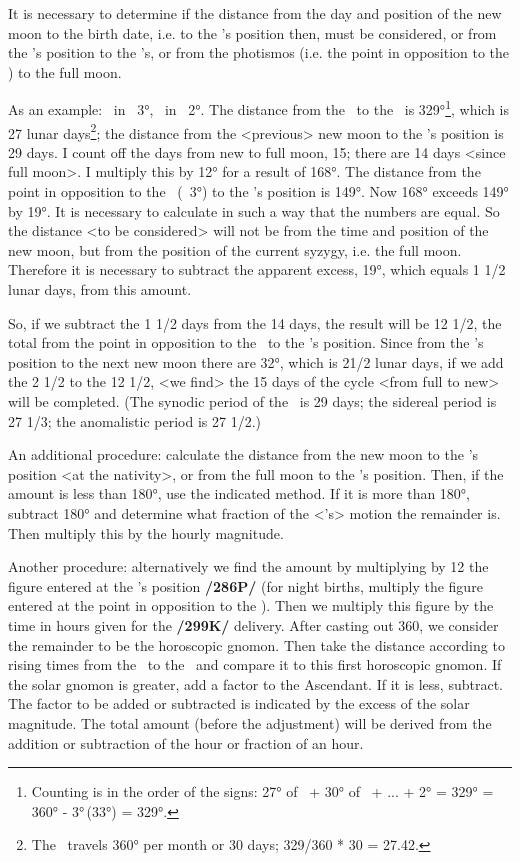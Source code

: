 It is necessary to determine if the distance from the day and position of
the new moon to the birth date, i.e. to the \Moon’s position then, must be considered, or from the \Sun’s position to the \Moon’s, or from the photismos (i.e. the point in opposition to the \Sun) to the full moon.

As an example: \Sun\, in \Taurus\, 3°, \Moon\, in \Aries\, 2°. The distance from the \Sun\, to the \Moon\, is 329°\footnote{Counting is in the order of the signs: 27° of \Taurus\, + 30° of \Gemini\, + ... + 2° \Aries = 329° = 360° - 3°\Taurus\,(33°) = 329°.}, which is 27 lunar days\footnote{The \Moon\, travels 360° per month or 30 days; 329/360 * 30 = 27.42.}; the distance from the <previous> new moon to the \Moon’s position is 29 days. I count off the days from new to full moon, 15; there are 14 days <since full moon>. I multiply this by 12°
for a result of 168°. The distance from the point in opposition to the \Sun\, (\Scorpio\, 3°) to the \Moon’s position is 149°. Now 168° exceeds 149° by 19°. It is necessary to calculate in such a way that the
numbers are equal. So the distance <to be considered> will not be from the time and position of the new moon, but from the position of the current syzygy, i.e. the full moon. Therefore it is necessary to subtract the apparent excess, 19°, which equals 1 1/2 lunar days, from this amount. 

So, if we subtract the 1 1/2 days from the 14 days, the result will be 12 1/2, the total from the point in opposition to the \Sun\, to the \Moon’s position. Since from the \Moon’s position to the next new moon there are 32°, which is 21/2 lunar days, if we add the 2 1/2 to the 12 1/2, <we find> the 15 days of the cycle <from full to new> will be completed. (The synodic period of the \Moon\, is 29 days; the sidereal period is 27 1/3; the anomalistic period is 27 1/2.)

An additional procedure: calculate the distance from the new moon to the \Moon’s position <at the nativity>, or from the full moon to the \Moon’s position. Then, if the amount is less than 180°, use the
indicated method. If it is more than 180°, subtract 180° and determine what fraction of the <\Moon’s> motion the remainder is. Then multiply this by the hourly magnitude.

Another procedure: alternatively we find the amount by multiplying by 12 the figure entered at the \Sun’s position \textbf{/286P/} (for night births, multiply the figure entered at the point in opposition to the \Sun). Then we multiply this figure by the time in hours given for the \textbf{/299K/} delivery. After casting out 360, we consider the remainder to be the horoscopic gnomon. Then take the distance according to rising times from the \Sun\, to the \Moon\, and compare it to this first horoscopic gnomon. If the solar gnomon is greater, add a factor to the Ascendant. If it is less, subtract. The factor to be added or subtracted is indicated by the excess of the solar magnitude. The total amount (before the adjustment) will be derived from the addition or subtraction of the hour or fraction of an hour.

\newpage